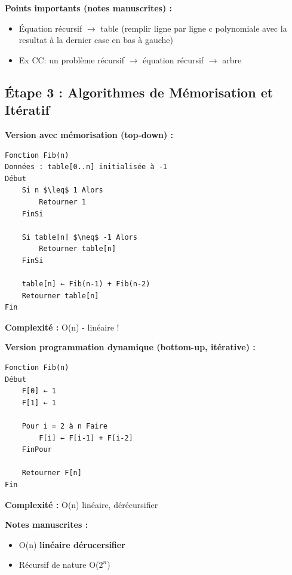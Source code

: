 \documentclass[12pt,a4paper]{article}
\begin{document}
\begin{notecours}
\textbf{Points importants (notes manuscrites) :}
\begin{itemize}
    \item Équation récursif $\rightarrow$ table (remplir ligne par ligne c polynomiale avec la resultat à la dernier case en bas à gauche)
    \item Ex CC: un problème récursif $\rightarrow$ équation récursif $\rightarrow$ arbre
\end{itemize}
\end{notecours}

\subsection{Étape 3 : Algorithmes de Mémorisation et Itératif}

\begin{algorithme}
\textbf{Version avec mémorisation (top-down) :}
\begin{verbatim}
Fonction Fib(n)
Données : table[0..n] initialisée à -1
Début
    Si n $\leq$ 1 Alors
        Retourner 1
    FinSi
    
    Si table[n] $\neq$ -1 Alors
        Retourner table[n]
    FinSi
    
    table[n] ← Fib(n-1) + Fib(n-2)
    Retourner table[n]
Fin
\end{verbatim}

\textbf{Complexité :} O(n) - linéaire !
\end{algorithme}

\begin{algorithme}
\textbf{Version programmation dynamique (bottom-up, itérative) :}
\begin{verbatim}
Fonction Fib(n)
Début
    F[0] ← 1
    F[1] ← 1
    
    Pour i = 2 à n Faire
        F[i] ← F[i-1] + F[i-2]
    FinPour
    
    Retourner F[n]
Fin
\end{verbatim}

\textbf{Complexité :} O(n) linéaire, dérécursifier
\end{algorithme}

\begin{notecours}
\textbf{Notes manuscrites :}
\begin{itemize}
    \item O(n) \textbf{linéaire dérucersifier}
    \item Récursif de nature O($2^n$)
\end{itemize}
\end{notecours}
\end{document}
